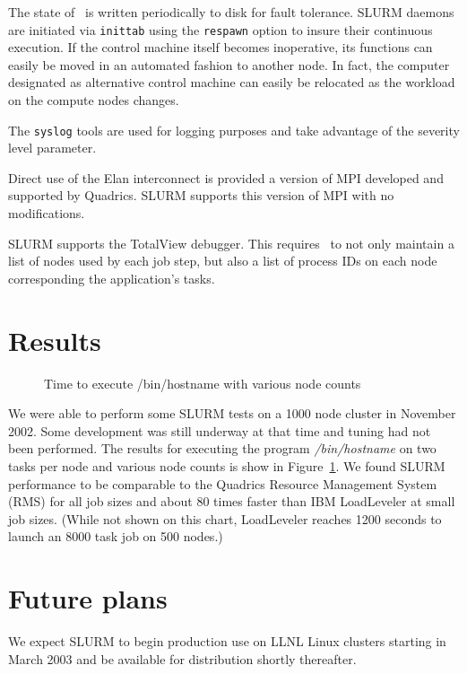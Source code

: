 The state of \slurmctld\ is written periodically to disk for fault tolerance. 
SLURM daemons are initiated via {\tt inittab} using 
the {\tt respawn} option to insure their continuous execution. 
If the control machine itself becomes inoperative, its functions can
easily be moved in an automated fashion to another node. In fact, the
computer designated as alternative control machine can easily be relocated as
the workload on the compute nodes changes. 

The {\tt syslog} tools are used for logging purposes and take advantage of the 
severity level parameter.

Direct use of the Elan interconnect is provided a version of MPI developed 
and supported by Quadrics. SLURM supports this version of MPI with no modifications. 

SLURM supports the TotalView debugger\cite{Etnus2002}. 
This requires \srun\ to not only maintain a list of nodes used by each 
job step, but also a list of process IDs on each node corresponding 
the application's tasks.

\section{Results}

\begin{figure}[htb]
\centerline{}
\caption{Time to execute /bin/hostname with various node counts}
\label{timing}
\end{figure}

We were able to perform some SLURM tests on a 1000 node cluster in 
November 2002. Some development was still underway at that time and 
tuning had not been performed. The results for executing the program 
{\em /bin/hostname} on two tasks per node and various node counts is show 
in Figure~\ref{timing}. We found SLURM performance to be comparable 
to the Quadrics Resource Management System (RMS)\cite{Quadrics2002} 
for all job sizes and about 80 times faster than IBM 
LoadLeveler\cite{LL2002} at small job sizes.
(While not shown on this chart, LoadLeveler reaches 1200 seconds to 
launch an 8000 task job on 500 nodes.)

\section{Future plans}

We expect SLURM to begin production use on LLNL Linux clusters 
starting in March 2003 and be available for distribution shortly 
thereafter. 

